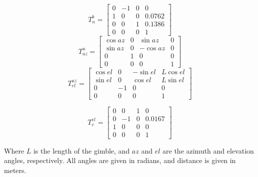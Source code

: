 \begin{itemize}
    \[
    T^b_n = \begin{bmatrix} 0 & -1 & 0 & 0 \\
                            1 & 0 & 0 & 0.0762 \\
                            0 & 0 & 1 & 0.1386 \\
                            0 & 0 & 0 & 1 \end{bmatrix}
    \]
    \[
    T^n_{az} = \begin{bmatrix} \cos{az} & 0 & \sin{az} & 0 \\
                               \sin{az} & 0 & -\cos{az} & 0 \\
                               0 & 1 & 0 & 0 \\
                               0 & 0 & 0 & 1 \end{bmatrix}
    \]
    \[
    T^{az}_{el} = \begin{bmatrix} \cos{el} & 0 & -\sin{el} & L \cos{el} \\
                                  \sin{el} & 0 & \cos{el} & L \sin{el} \\
                                  0 & -1 & 0 & 0 \\
                                  0 & 0 & 0 & 1\end{bmatrix}
    \]

    \[
    T^{el}_{c} = \begin{bmatrix} 0 &  0 & 1 & 0 \\
                                 0 & -1 & 0 & 0.0167 \\
                                 1 &  0 & 0 & 0 \\
                                 0 &  0 & 0 & 1 \end{bmatrix}
    \]

Where $L$ is the length of the gimble, and $az$ and $el$ are the azimuth and elevation angles, respectively. All angles are given in radians, and distance is given in meters.

\end{itemize}